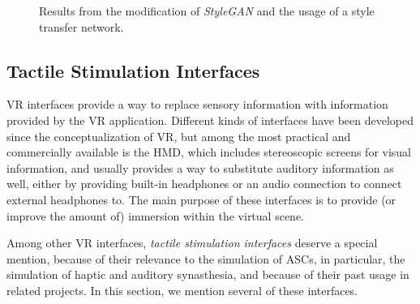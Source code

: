 \begin{figure}%
    \centering
    \qquad
    \caption{Results from the modification of \textit{StyleGAN} and the usage of a style transfer network.}%
    \label{fig:schartner2020neural}%
\end{figure}

\subsection{Tactile Stimulation Interfaces}\label{sec:tactile_stimulation_interfaces}
\ac{VR} interfaces provide a way to replace sensory information with information provided by the \ac{VR} application. Different kinds of interfaces have been developed since the conceptualization of \ac{VR}, but among the most practical and commercially available is the \ac{HMD}, which includes stereoscopic screens for visual information, and usually provides a way to substitute auditory information as well, either by providing built-in headphones or an audio connection to connect external headphones to. The main purpose of these interfaces is to provide (or improve the amount of) immersion within the virtual scene.

Among other \ac{VR} interfaces, \textit{tactile stimulation interfaces} deserve a special mention, because of their relevance to the simulation of \acp{ASC}, in particular, the simulation of haptic and auditory synasthesia, and because of their past usage in related projects. In this section, we mention several of these interfaces.

